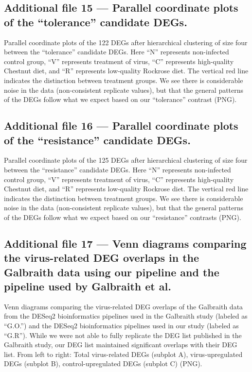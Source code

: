 \documentclass{bmcart}
\begin{document}
\begin{linenumbers}
\begin{backmatter}
   \subsection*{Additional file 15 --- Parallel coordinate plots of the ``tolerance'' candidate DEGs.}    
    Parallel coordinate plots of the 122 DEGs after hierarchical clustering of size four between the ``tolerance'' candidate DEGs. Here ``N'' represents non-infected control group, ``V'' represents treatment of virus, ``C'' represents high-quality Chestnut diet, and ``R'' represents low-quality Rockrose diet. The vertical red line indicates the distinction between treatment groups. We see there is considerable noise in the data (non-consistent replicate values), but that the general patterns of the DEGs follow what we expect based on our ``tolerance'' contrast (PNG).
    
   \subsection*{Additional file 16 --- Parallel coordinate plots of the ``resistance'' candidate DEGs.}    
    Parallel coordinate plots of the 125 DEGs after hierarchical clustering of size four between the ``resistance'' candidate DEGs. Here ``N'' represents non-infected control group, ``V'' represents treatment of virus, ``C'' represents high-quality Chestnut diet, and ``R'' represents low-quality Rockrose diet. The vertical red line indicates the distinction between treatment groups. We see there is considerable noise in the data (non-consistent replicate values), but that the general patterns of the DEGs follow what we expect based on our ``resistance'' contrasts (PNG).

   \subsection*{Additional file 17 --- Venn diagrams comparing the virus-related DEG overlaps in the Galbraith data using our pipeline and the pipeline used by Galbraith et al.}
  Venn diagrams comparing the virus-related DEG overlaps of the Galbraith data from the DESeq2 bioinformatics pipelines used in the Galbraith study (labeled as ``G.O.'') and the DESeq2 bioinformatics pipelines used in our study (labeled as ``G.R''). While we were not able to fully replicate the DEG list published in the Galbraith study, our DEG list maintained significant overlaps with their DEG list. From left to right: Total virus-related DEGs (subplot A), virus-upregulated DEGs (subplot B), control-upregulated DEGs (subplot C) (PNG).
    

\end{backmatter}
\end{linenumbers}
\end{document}
